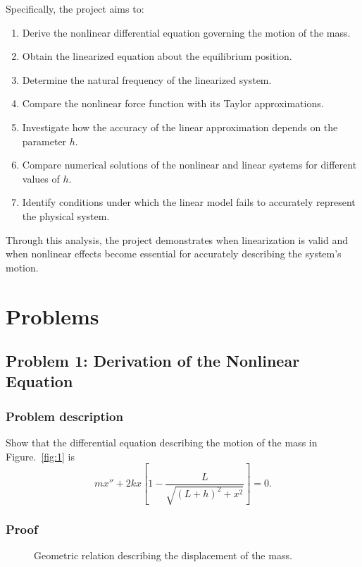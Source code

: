 \documentclass[12pt, a4paper]{report}
\newcommand{\figref}{Figure.~\ref}
\begin{document}
	Specifically, the project aims to:
	\begin{enumerate}
		\item Derive the nonlinear differential equation governing the motion of the mass.
		\item Obtain the linearized equation about the equilibrium position.
		\item Determine the natural frequency of the linearized system.
		\item Compare the nonlinear force function with its Taylor approximations.
		\item Investigate how the accuracy of the linear approximation depends on the parameter $h$.
		\item Compare numerical solutions of the nonlinear and linear systems for different values of $h$.
		\item Identify conditions under which the linear model fails to accurately represent the physical system.
	\end{enumerate}
	
	Through this analysis, the project demonstrates when linearization is valid and when nonlinear effects become essential for accurately describing the system's motion.
	
	\chapter{Problems}
	\section{Problem 1: Derivation of the Nonlinear Equation}
	\subsection{Problem description}
	Show that the differential equation describing the motion of the mass in \figref{fig:1} is
	\begin{equation}
		mx'' + 2kx \left[ 1 - \dfrac{L}{\sqrt{(L + h)^2 + x^2}} \right] = 0. \label{eq:problem1:1}
	\end{equation}
	
	\subsection{Proof}
	
	\begin{figure}[hbt!]
		\centering
		
		\caption{Geometric relation describing the displacement of the mass.}
	\end{figure}
	
\end{document}

